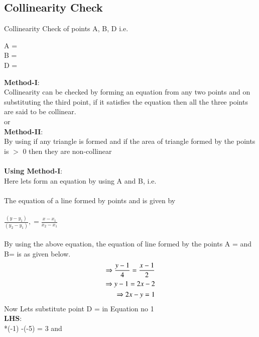 \documentclass[journal,12pt,twocolumn]{IEEEtran}
\begin{document}
\subsection{Collinearity Check} Collinearity Check of points A, B, D i.e. 
\begin{center}
A =\\
B =\\
D =\\
\end{center}
\textbf{Method-I}:
\\Collinearity can be checked by forming an equation from any two points and on substituting the third point, if it satisfies the equation then all the three points are said to be collinear. \\ or\\
\textbf{Method-II}:
\\ By using if any triangle is formed and if the area of triangle formed by the points is $>$ 0 then they are non-collinear
\\
\\
\textbf{Using Method-I}:\\
Here lets form an equation by using A and B, i.e.  
\\
\\

The equation of a line formed by points  and  is given by
\\
\\
\begin{math}
    \frac{(y-y_1)}{(y_2-y_1)},=\frac{x-x_1}{x_2-x_1}
\end{math}
\\
\\
By using the above equation, the equation of line formed by the points A =  and B= is as given below.
\\
\begin{equation}\label{\overrightarrow{AB}}
\begin{split}
\Rightarrow \frac{y-1}{4}=\frac{x-1}{2}\\
\Rightarrow y-1 = 2x-2\\
\Rightarrow 2x-y=1
\end{split}
\end{equation}
Now Lets substitute point D =  in Equation no {1}\\
\textbf{LHS}:\\
*(-1) -(-5) = 3  and \\
\end{document}
